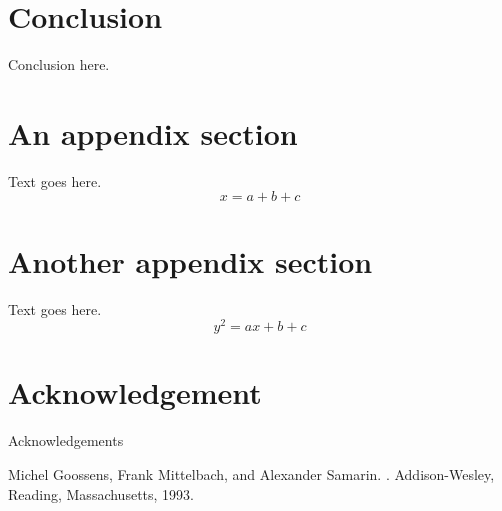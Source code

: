 \documentclass{pramana}
\begin{document}
\section{Conclusion}
Conclusion here.



\appendix

\section{An appendix section}
Text goes here.
\begin{equation}
x=a+b+c
\end{equation}
\section{Another appendix section}
Text goes here.
\begin{equation}
y^2=ax+b+c
\end{equation}
\section*{Acknowledgement}
Acknowledgements


\begin{thebibliography}{99} 
Michel Goossens, Frank Mittelbach, and Alexander Samarin. 
. 
Addison-Wesley, Reading, Massachusetts, 1993.
\end{thebibliography}
\end{document}
